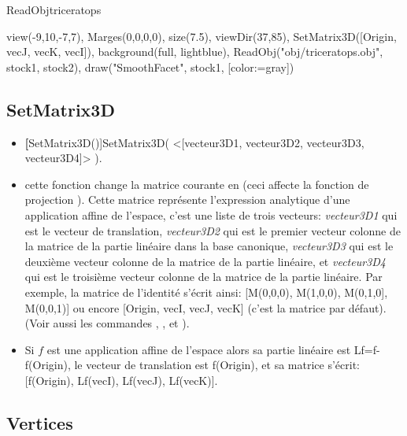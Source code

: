 \pngtrue
\begin{demo}{ReadObj}{triceratops}
\begin{texgraph}[name=triceratops, export=none]
 view(-9,10,-7,7), Marges(0,0,0,0),
 size(7.5), viewDir(37,85),
 SetMatrix3D([Origin, vecJ, vecK, vecI]),
 background(full, lightblue),
 ReadObj("obj/triceratops.obj", stock1, stock2),
 draw("SmoothFacet", stock1, [color:=gray])
\end{texgraph}
\end{demo}
\pngfalse


\subsection{SetMatrix3D}\label{cmdSetMatrix3D}

\begin{itemize}
 \item \util \textbf[SetMatrix3D()]{SetMatrix3D( <[vecteur3D1, vecteur3D2, vecteur3D3, vecteur3D4]> )}.
 \item \desc cette fonction change la matrice courante en  (ceci affecte la fonction de projection ). Cette matrice représente l'expression analytique d'une application affine de l'espace, c'est une liste de trois vecteurs: \textsl{vecteur3D1} qui est le vecteur de translation, \textsl{vecteur3D2} qui est le premier vecteur colonne de la matrice de la partie linéaire dans la base canonique, \textsl{vecteur3D3} qui est le deuxième vecteur colonne de la matrice de la partie linéaire, et \textsl{vecteur3D4} qui est le troisième vecteur colonne de la matrice de la partie linéaire. Par exemple, la matrice de l'identité s'écrit ainsi: [M(0,0,0), M(1,0,0), M(0,1,0], M(0,0,1)] ou encore [Origin, vecI, vecJ, vecK] (c'est la matrice par défaut). (Voir aussi les commandes , , et ). 
 \item Si $f$ est une application affine de l'espace alors sa partie linéaire est Lf=f-f(Origin), le vecteur de
translation est f(Origin), et sa matrice s'écrit: [f(Origin), Lf(vecI), Lf(vecJ), Lf(vecK)].

\end{itemize}

\subsection{Vertices}\label{cmdSommets}

